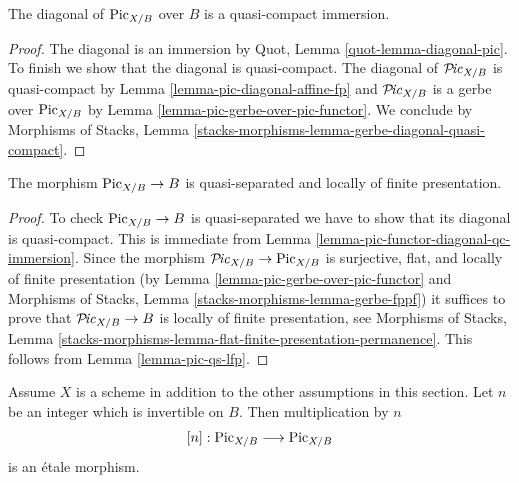 \begin{lemma}
\label{lemma-pic-functor-diagonal-qc-immersion}
The diagonal of $\mathrm{Pic}_{X/B}$ over $B$ is a quasi-compact immersion.
\end{lemma}

\begin{proof}
The diagonal is an immersion by Quot, Lemma \ref{quot-lemma-diagonal-pic}.
To finish we show that the diagonal is quasi-compact.
The diagonal of $\mathcal{P}\!\mathit{ic}_{X/B}$ is quasi-compact
by Lemma \ref{lemma-pic-diagonal-affine-fp} and
$\mathcal{P}\!\mathit{ic}_{X/B}$ is a gerbe over $\mathrm{Pic}_{X/B}$ by
Lemma \ref{lemma-pic-gerbe-over-pic-functor}.
We conclude by Morphisms of Stacks, Lemma
\ref{stacks-morphisms-lemma-gerbe-diagonal-quasi-compact}.
\end{proof}

\begin{lemma}
\label{lemma-pic-functor-qs-lfp}
The morphism $\mathrm{Pic}_{X/B} \to B$ is quasi-separated and
locally of finite presentation.
\end{lemma}

\begin{proof}
To check $\mathrm{Pic}_{X/B} \to B$ is quasi-separated we have to
show that its diagonal is quasi-compact. This is immediate from
Lemma \ref{lemma-pic-functor-diagonal-qc-immersion}.
Since the morphism $\mathcal{P}\!\mathit{ic}_{X/B} \to \mathrm{Pic}_{X/B}$
is surjective, flat, and locally of finite presentation
(by Lemma \ref{lemma-pic-gerbe-over-pic-functor} and
Morphisms of Stacks, Lemma \ref{stacks-morphisms-lemma-gerbe-fppf})
it suffices to prove that $\mathcal{P}\!\mathit{ic}_{X/B} \to B$
is locally of finite presentation, see
Morphisms of Stacks, Lemma
\ref{stacks-morphisms-lemma-flat-finite-presentation-permanence}.
This follows
from Lemma \ref{lemma-pic-qs-lfp}.
\end{proof}

\begin{lemma}
\label{lemma-pic-functor-multiplication-etale}
Assume $X$ is a scheme in addition to the other assumptions in this
section. Let $n$ be an integer which is invertible on $B$. Then
multiplication by $n$
$$
[n] : \mathrm{Pic}_{X/B} \longrightarrow \mathrm{Pic}_{X/B}
$$
is an \'etale morphism.
\end{lemma}

